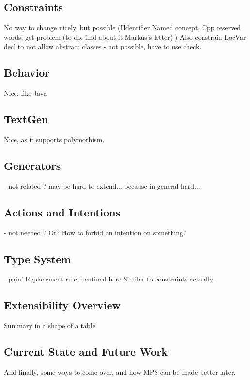 \subsection{Constraints}

No way to change nicely, but possible (IIdentifier Named concept, Cpp reserved words, get problem (to do: find about it Markus's letter) )
Also constrain LocVar decl to not allow abstract classes - not possible, have to use check.

\subsection{Behavior}

Nice, like Java

\subsection{TextGen}

Nice, as it supports polymorhism.

\subsection{Generators}
- not related ?
may be hard to extend... because in general hard...

\subsection{Actions and Intentions}
- not needed ? Or? How to forbid an intention on something?


\subsection{Type System}
- pain! Replacement rule mentined here
Similar to constraints actually.


\subsection{Extensibility Overview}
Summary in a shape of a table


\subsection{Current State and Future Work}
And finally, some ways to come over, and how MPS can be made better later.


